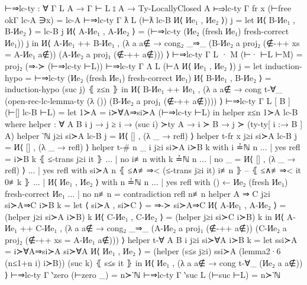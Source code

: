 \documentclass[logo,bsc,singlespacing,parskip,online]{infthesis}
\renewenvironment{code}{\mintedcopy[breaklines,breaksymbolleft=\;]{agda}}{\endmintedcopy}
\begin{document}
\begin{code}
  ⊢⇒lc-ty : ∀ {Γ L A} → Γ ⊢ L ⦂ A → Ty-LocallyClosed A
  ⊢⇒lc-ty {Γ} {fr x} (⊢free okΓ lc-A ∋x) = lc-A
  ⊢⇒lc-ty {Γ} {ƛ L} (⊢ƛ lc-B И⟨ Иe₁ , Иe₂ ⟩) j =
    let И⟨ B-Иe₁ , B-Иe₂ ⟩ = lc-B j
        И⟨ A-Иe₁ , A-Иe₂ ⟩ = (⊢⇒lc-ty (Иe₂ (fresh Иe₁) {fresh-correct Иe₁})) j
    in И⟨ A-Иe₁ ++ B-Иe₁ , (λ a {a∉} → cong₂ _⇒_
      (B-Иe₂ a {proj₂ (∉-++ {xs = A-Иe₁} a∉)})
      (A-Иe₂ a {proj₁ (∉-++ a∉)})) ⟩
  ⊢⇒lc-ty {Γ} {L · M} (⊢· ⊢L ⊢M) = proj₂ (⇒-≻ (⊢⇒lc-ty ⊢L))
  ⊢⇒lc-ty {Γ} {Λ L} (⊢Λ И⟨ Иe₁ , Иe₂ ⟩) j =
    let induction-hypo = ⊢⇒lc-ty (Иe₂ (fresh Иe₁) {fresh-correct Иe₁})
        И⟨ B-Иe₁ , B-Иe₂ ⟩ = induction-hypo (suc j) ⦃ z≤n ⦄
    in И⟨ B-Иe₁ ++ Иe₁ , (λ a {a∉} → cong t-∀_
      (open-rec-lc-lemma-ty
        (λ ())
        (B-Иe₂ a {proj₁ (∉-++ a∉)}))) ⟩
  ⊢⇒lc-ty {Γ} {L [ B ]} (⊢[] lc-B ⊢L) =
    let 1≻A = i≻∀A⇒si≻A (⊢⇒lc-ty ⊢L)
    in helper z≤n 1≻A lc-B
    where
      helper : ∀ {A B i j} → j ≥ i → (suc i) ≻ty A → i ≻ B → j ≻ (ty-ty[ i :→ B ] A)
      helper {‵ℕ} j≥i si≻A lc-B j = И⟨ [] , (λ _ → refl) ⟩
      helper {t-fr x} j≥i si≻A lc-B j = И⟨ [] , (λ _ → refl) ⟩
      helper {t-# n} {_} {i} j≥i si≻A i≻B k with i ≟ℕ n
      ... | yes refl = i≻B k ⦃ ≤-trans j≥i it ⦄
      ... | no  i≢n  with k ≟ℕ n
      ...   | no  _    = И⟨ [] , (λ _ → refl) ⟩
      ...   | yes refl with si≻A n ⦃ ≤∧≢⇒< (≤-trans j≥i it) i≢n ⦄ -- ⦃ ≤∧≢⇒< it 0≢k ⦄
      ...     | И⟨ Иe₁ , Иe₂ ⟩ with n ≟ℕ n
      ...       | yes refl with () ← Иe₂ (fresh Иe₁) {fresh-correct Иe₁}
      ...       | no  n≢n =  contradiction refl n≢n
      helper {A ⇒ C} j≥i si≻A⇒C i≻B k =
        let ⟨ si≻A , si≻C ⟩ = ⇒-≻ si≻A⇒C
            И⟨ A-Иe₁ , A-Иe₂ ⟩ = (helper j≥i si≻A i≻B) k
            И⟨ C-Иe₁ , C-Иe₂ ⟩ = (helper j≥i si≻C i≻B) k
        in И⟨ A-Иe₁ ++ C-Иe₁ , (λ a {a∉} → cong₂ _⇒_
          (A-Иe₂ a {proj₁ (∉-++ a∉)})
          (C-Иe₂ a {proj₂ (∉-++ {xs = A-Иe₁} a∉)})) ⟩
      helper {t-∀ A} {B} {i} j≥i si≻∀A i≻B k =
        let ssi≻A = i≻∀A⇒si≻A si≻∀A
            И⟨ Иe₁ , Иe₂ ⟩ = (helper (s≤s j≥i) ssi≻A (lemma2·6 (n≤1+n i) i≻B)) (suc k) ⦃ s≤s it ⦄
        in И⟨ Иe₁ , (λ a {a∉} → cong t-∀_ (Иe₂ a {a∉})) ⟩
  ⊢⇒lc-ty {Γ} {‵zero} (⊢zero _) = n≻‵ℕ
  ⊢⇒lc-ty {Γ} {‵suc L} (⊢suc ⊢L) = n≻‵ℕ


\end{code}
\end{document}
